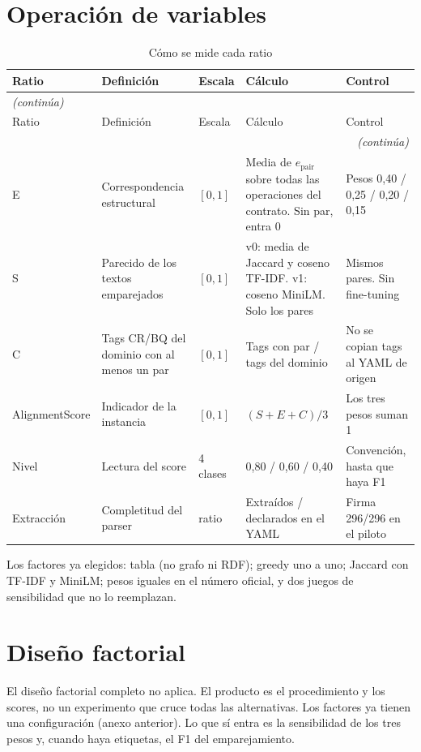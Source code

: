 \chapter{Operación de variables}
\label{anexo:operacion}

\begin{longtable}{@{}p{}p{}p{}p{}p{}@{}}
\caption{Cómo se mide cada ratio} \label{tab:operacion} \\
\toprule
Ratio & Definición & Escala & Cálculo & Control \\
\midrule
\endfirsthead
\multicolumn{5}{l}{\textit{(continúa)}} \\
\midrule
Ratio & Definición & Escala & Cálculo & Control \\
\midrule
\endhead
\midrule
\multicolumn{5}{r}{\textit{(continúa)}} \\
\endfoot
\bottomrule
\endlastfoot
E & Correspondencia estructural & $[0,1]$ & Media de $e_{\mathrm{pair}}$ sobre todas las operaciones del contrato. Sin par, entra 0 & Pesos 0,40 / 0,25 / 0,20 / 0,15 \\
S & Parecido de los textos emparejados & $[0,1]$ & v0: media de Jaccard y coseno TF-IDF. v1: coseno MiniLM. Solo los pares & Mismos pares. Sin fine-tuning \\
C & Tags CR/BQ del dominio con al menos un par & $[0,1]$ & Tags con par / tags del dominio & No se copian tags al YAML de origen \\
AlignmentScore & Indicador de la instancia & $[0,1]$ & $(S+E+C)/3$ & Los tres pesos suman 1 \\
Nivel & Lectura del score & 4 clases & 0,80 / 0,60 / 0,40 & Convención, hasta que haya F1 \\
Extracción & Completitud del parser & ratio & Extraídos / declarados en el YAML & Firma 296/296 en el piloto \\
\end{longtable}

Los factores ya elegidos: tabla (no grafo ni RDF); greedy uno a uno; Jaccard con TF-IDF y MiniLM; pesos iguales en el número oficial, y dos juegos de sensibilidad que no lo reemplazan.

\chapter{Diseño factorial}
\label{anexo:factorial}

El diseño factorial completo no aplica. El producto es el procedimiento y los scores, no un experimento que cruce todas las alternativas. Los factores ya tienen una configuración (anexo anterior). Lo que sí entra es la sensibilidad de los tres pesos y, cuando haya etiquetas, el F1 del emparejamiento.

